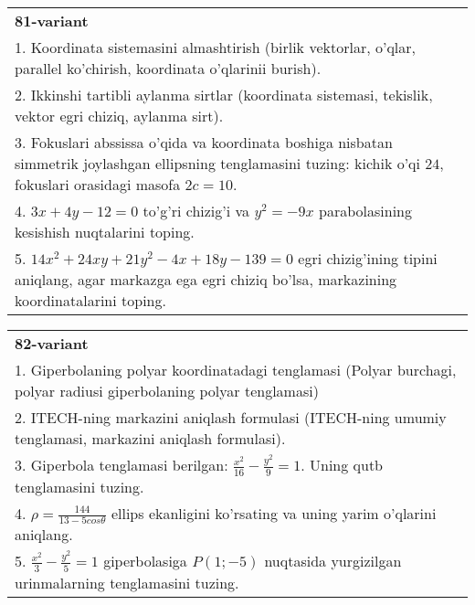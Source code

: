 \documentclass{article}
\begin{document}
\begin{tabular}{m{17cm}}
\textbf{81-variant}\\
1. Koordinata sistemasini almashtirish (birlik vektorlar, o'qlar, parallel ko'chirish, koordinata o'qlarinii burish).\\

2. Ikkinshi tartibli aylanma sirtlar (koordinata sistemasi, tekislik, vektor egri chiziq, aylanma sirt).\\

3. Fokuslari abssissa o'qida va koordinata boshiga nisbatan simmetrik joylashgan ellipsning tenglamasini tuzing: kichik o'qi $24$, fokuslari orasidagi masofa $2c=10$.\\

4. $3x + 4y - 12 = 0$ to'g'ri chizig'i va $y^{2} = - 9x$ parabolasining kesishish nuqtalarini toping.\\

5. $14x^{2} + 24xy + 21y^{2} - 4x + 18y - 139 = 0$ egri chizig'ining tipini aniqlang, agar markazga ega egri chiziq bo'lsa, markazining koordinatalarini toping.  
\end{tabular}
\vspace{1cm}


\begin{tabular}{m{17cm}}
\textbf{82-variant}\\
1. Giperbolaning polyar koordinatadagi tenglamasi (Polyar burchagi, polyar radiusi giperbolaning polyar tenglamasi)\\

2. ITECH-ning markazini aniqlash formulasi (ITECH-ning umumiy tenglamasi, markazini aniqlash formulasi).\\

3. Giperbola tenglamasi berilgan: $\frac{x^{2}}{16}-\frac{y^{2}}{9}=1$. Uning qutb tenglamasini tuzing.\\

4. $\rho = \frac{144}{13 - 5cos\theta}$ ellips ekanligini ko'rsating va uning yarim o'qlarini aniqlang.\\

5. $\frac{x^{2}}{3} - \frac{y^{2}}{5} = 1$ giperbolasiga $P(1; - 5)$ nuqtasida yurgizilgan urinmalarning tenglamasini tuzing.
\end{tabular}
\vspace{1cm}
\end{document}
